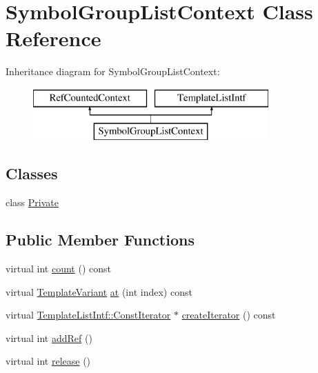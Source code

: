 \hypertarget{class_symbol_group_list_context}{}\section{Symbol\+Group\+List\+Context Class Reference}
\label{class_symbol_group_list_context}
Inheritance diagram for Symbol\+Group\+List\+Context\+:\begin{figure}[H]
\begin{center}
\leavevmode
\includegraphics[height=2.000000cm]{class_symbol_group_list_context}
\end{center}
\end{figure}
\subsection*{Classes}
\begin{DoxyCompactItemize}
\item 
class \mbox{\hyperlink{class_symbol_group_list_context_1_1_private}{Private}}
\end{DoxyCompactItemize}
\subsection*{Public Member Functions}
\begin{DoxyCompactItemize}
\item 
virtual int \mbox{\hyperlink{class_symbol_group_list_context_ad3561a3a506b3e9026b11e7dba59ad07}{count}} () const
\item 
virtual \mbox{\hyperlink{class_template_variant}{Template\+Variant}} \mbox{\hyperlink{class_symbol_group_list_context_aec1ee26a6f7899e37ba0b70c1ca5b744}{at}} (int index) const
\item 
virtual \mbox{\hyperlink{class_template_list_intf_1_1_const_iterator}{Template\+List\+Intf\+::\+Const\+Iterator}} $\ast$ \mbox{\hyperlink{class_symbol_group_list_context_a0ce2ecdbdb99934092e50b4320bb6242}{create\+Iterator}} () const
\item 
virtual int \mbox{\hyperlink{class_symbol_group_list_context_af075e8357cbbc474f2e71e31a9b40362}{add\+Ref}} ()
\item 
virtual int \mbox{\hyperlink{class_symbol_group_list_context_a109a389eaead2b786cf4e7d607652e67}{release}} ()
\end{DoxyCompactItemize}
